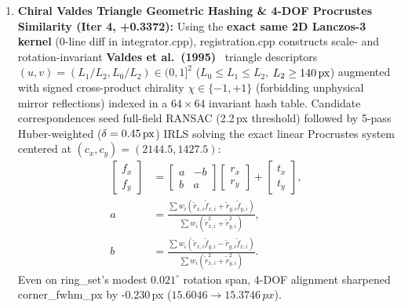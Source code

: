 \documentclass[10pt,twocolumn,letterpaper]{article}
\DeclareRobustCommand{\code}[1]{\texttt{#1}}
\def\code#1{#1}%
\begin{document}
\begin{enumerate}
  \item \textbf{Chiral Valdes Triangle Geometric Hashing \& 4-DOF Procrustes Similarity (\code{Iter 4}, \code{+0.3372}):}
  Using the \textbf{exact same 2D Lanczos-3 kernel} (\code{0}-line diff in \code{integrator.cpp}), \code{registration.cpp} constructs scale- and rotation-invariant \textbf{Valdes et al.\ (1995)}~\cite{valdes1995focas} triangle descriptors $(u, v) = (L_1/L_2, L_0/L_2) \in (0, 1]^2$ ($L_0 \le L_1 \le L_2$, $L_2 \ge 140\text{\,px}$) augmented with signed cross-product chirality $\chi \in \{-1, +1\}$ (forbidding unphysical mirror reflections) indexed in a $64\times 64$ invariant hash table. Candidate correspondences seed full-field RANSAC (\code{2.2\,px} threshold) followed by 5-pass Huber-weighted ($\delta = 0.45\text{\,px}$) IRLS solving the exact linear Procrustes system centered at $(c_x, c_y) = (2144.5, 1427.5)$:
  \begin{equation}
    \begin{aligned}
      \begin{bmatrix} f_x \\ f_y \end{bmatrix} &=
      \begin{bmatrix} a & -b \\ b & a \end{bmatrix}
      \begin{bmatrix} r_x \\ r_y \end{bmatrix} +
      \begin{bmatrix} t_x \\ t_y \end{bmatrix}, \\
      a &= \frac{\sum w_i (\tilde{r}_{x,i}\tilde{f}_{x,i} + \tilde{r}_{y,i}\tilde{f}_{y,i})}{\sum w_i (\tilde{r}_{x,i}^2 + \tilde{r}_{y,i}^2)}, \\
      b &= \frac{\sum w_i (\tilde{r}_{x,i}\tilde{f}_{y,i} - \tilde{r}_{y,i}\tilde{f}_{x,i})}{\sum w_i (\tilde{r}_{x,i}^2 + \tilde{r}_{y,i}^2)}.
    \end{aligned}
    \label{eq:procrustes}
  \end{equation}
  Even on \code{ring\_set}'s modest $0.021^\circ$ rotation span, 4-DOF alignment sharpened \code{corner\_fwhm\_px} by \code{-0.230\,px} ($\code{15.6046} \to \code{15.3746\,px}$).


\end{enumerate}
\end{document}
